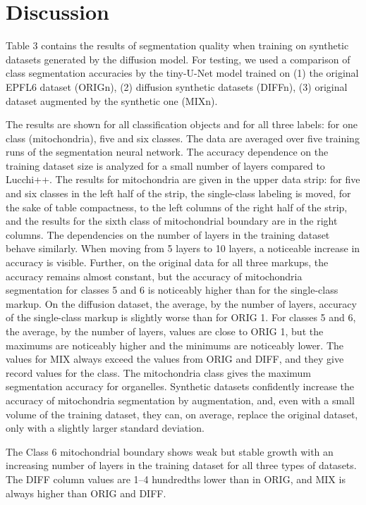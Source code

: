 \documentclass[journal,article,submit,pdftex,moreauthors]{Definitions/mdpi}
\begin{document}
\section{Discussion}

Table 3 contains the results of segmentation quality when training on synthetic datasets
generated by the diffusion model. For testing, we used a comparison of class segmentation
accuracies by the tiny-U-Net model trained on (1) the original EPFL6 dataset (ORIGn),
(2) diffusion synthetic datasets (DIFFn), (3) original dataset augmented by the synthetic
one (MIXn).

The results are shown for all classification objects and for all three labels: for one class (mitochondria), five and six classes. The data are averaged over five training runs of the segmentation neural network. The accuracy dependence on the training dataset size is analyzed for a small number of layers compared to Lucchi++. The results for mitochondria are given in the upper data strip: for five and six classes in the left half of the strip, the single-class labeling is moved, for the sake of table compactness, to the left columns of the right half of the strip, and the results for the sixth class of mitochondrial boundary are in the right columns. The dependencies on the number of layers in the training dataset behave similarly. When moving from 5 layers to 10 layers, a noticeable increase in accuracy is visible. Further, on the original data for all three markups, the accuracy remains almost constant, but the accuracy of mitochondria segmentation for classes 5 and 6 is noticeably higher than for the single-class markup. On the diffusion dataset, the average, by the number of layers, accuracy of the single-class markup is slightly worse than for ORIG 1. For classes 5 and 6, the average, by the number of layers, values are close to ORIG 1, but the maximums are noticeably higher and the minimums are noticeably lower. The values for MIX always exceed the values from ORIG and DIFF, and they give record values for the class. The mitochondria class gives the maximum segmentation accuracy for organelles. Synthetic datasets confidently increase the accuracy of mitochondria segmentation by augmentation, and, even with a small volume of the training dataset, they can, on average, replace the original dataset, only with a slightly larger standard deviation.

The Class 6 mitochondrial boundary shows weak but stable growth with an increasing number of layers in the training dataset for all three types of datasets. The DIFF column values are 1–4 hundredths lower than in ORIG, and MIX is always higher than ORIG and DIFF.
\end{document}
